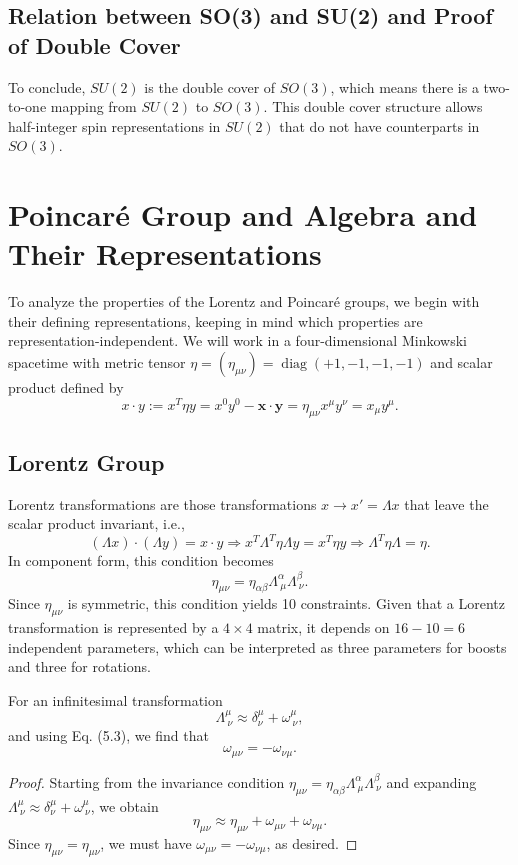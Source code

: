 \subsection{Relation between SO(3) and SU(2) and Proof of Double Cover}

To conclude, $SU(2)$ is the double cover of $SO(3)$, which means there is a two-to-one mapping from $SU(2)$ to $SO(3)$. This double cover structure allows half-integer spin representations in $SU(2)$ that do not have counterparts in $SO(3)$.

\section{Poincaré Group and Algebra and Their Representations}

To analyze the properties of the Lorentz and Poincaré groups, we begin with their defining representations, keeping in mind which properties are representation-independent. We will work in a four-dimensional Minkowski spacetime with metric tensor $\eta = (\eta_{\mu \nu}) = \operatorname{diag}(+1, -1, -1, -1)$ and scalar product defined by
\[
x \cdot y := x^T \eta y = x^0 y^0 - \mathbf{x} \cdot \mathbf{y} = \eta_{\mu \nu} x^\mu y^\nu = x_\mu y^\mu.
\]

\subsection{Lorentz Group}

Lorentz transformations are those transformations $x \to x' = \Lambda x$ that leave the scalar product invariant, i.e.,
\[
(\Lambda x) \cdot (\Lambda y) = x \cdot y \Rightarrow x^T \Lambda^T \eta \Lambda y = x^T \eta y \Rightarrow \Lambda^T \eta \Lambda = \eta.
\]
In component form, this condition becomes
\[
\eta_{\mu \nu} = \eta_{\alpha \beta} \Lambda^\alpha_{\ \mu} \Lambda^\beta_{\ \nu}.
\]
Since $\eta_{\mu \nu}$ is symmetric, this condition yields 10 constraints. Given that a Lorentz transformation is represented by a $4 \times 4$ matrix, it depends on $16 - 10 = 6$ independent parameters, which can be interpreted as three parameters for boosts and three for rotations.

For an infinitesimal transformation
\[
\Lambda^\mu_{\ \nu} \approx \delta^\mu_\nu + \omega^\mu_{\ \nu},
\]
and using Eq. (5.3), we find that
\[
\omega_{\mu \nu} = -\omega_{\nu \mu}.
\]

\begin{proof}
Starting from the invariance condition $\eta_{\mu \nu} = \eta_{\alpha \beta} \Lambda^\alpha_{\ \mu} \Lambda^\beta_{\ \nu}$ and expanding $\Lambda^\mu_{\ \nu} \approx \delta^\mu_\nu + \omega^\mu_{\ \nu}$, we obtain
\[
\eta_{\mu \nu} \approx \eta_{\mu \nu} + \omega_{\mu \nu} + \omega_{\nu \mu}.
\]
Since $\eta_{\mu \nu} = \eta_{\mu \nu}$, we must have $\omega_{\mu \nu} = -\omega_{\nu \mu}$, as desired.
\end{proof}


